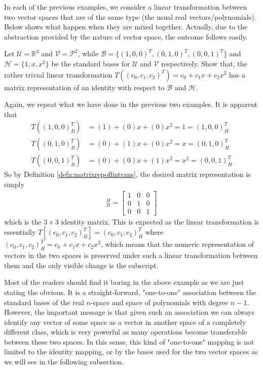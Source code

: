 In each of the previous examples, we consider a linear transformation between two vector spaces that are of the same type (the usual real vectors/polynomials). Below shows what happen when they are mixed together. Actually, due to the abstraction provided by the nature of vector space, the outcome follows easily.
\begin{exmp}
Let $\mathcal{U} = \mathbb{R}^3$ and $\mathcal{V} = \mathcal{P}^2$, while $\mathcal{B} = \{(1,0,0)^T, (0,1,0)^T, (0,0,1)^T\}$ and $\mathcal{H} = \{1, x, x^2\}$ be the standard bases for $\mathcal{U}$ and $\mathcal{V}$ respectively. Show that, the rather trivial linear transformation $T((c_0, c_1, c_2)^T) = c_0 + c_1x + c_2x^2$ has a matrix representation of an identity with respect to $\mathcal{B}$ and $\mathcal{H}$.
\end{exmp}
\begin{solution}
Again, we repeat what we have done in the previous two examples. It is apparent that
\begin{align*}
T((1,0,0)^T_B) &= (1) + (0)x + (0)x^2 = 1 = (1,0,0)^T_H\\
T((0,1,0)^T_B) &= (0) + (1)x + (0)x^2 = x = (0,1,0)^T_H\\
T((0,0,1)^T_B) &= (0) + (0)x + (1)x^2 = x^2 = (0,0,1)^T_H
\end{align*}
So by Definition \ref{defn:matrixrepoflintrans}, the desired matrix representation is simply
\begin{align*}
[T]_B^H = 
\begin{bmatrix}
1 & 0 & 0 \\
0 & 1 & 0 \\
0 & 0 & 1
\end{bmatrix}
\end{align*}
which is the $3 \times 3$ identity matrix. This is expected as the linear transformation is essentially $T[(c_0, c_1, c_2)_B^T] = (c_0, c_1, c_2)_H^T$ where $(c_0, c_1, c_2)_H^T = c_0 + c_1x + c_2x^2$, which means that the numeric representation of vectors in the two spaces is preserved under such a linear transformation between them and the only visible change is the subscript.
\end{solution}
Most of the readers should find it boring in the above example as we are just stating the obvious. It is a straight-forward, "one-to-one" association between the standard bases of the real $n$-space and space of polynomials with degree $n-1$. However, the important message is that given such an association we can always identify any vector of some space as a vector in another space of a completely different class, which is very powerful as many operations become transferable between these two spaces. In this sense, this kind of "one-to-one" mapping is not limited to the identity mapping, or by the bases used for the two vector spaces as we will see in the following subsection.

